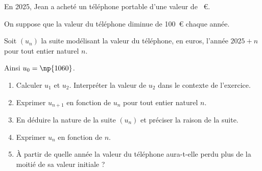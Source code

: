 En 2025, Jean a acheté un téléphone portable d'une valeur de ~\euro.

On suppose que la valeur du téléphone diminue de 100~\euro{} chaque année.

Soit $\left(u_n\right)$ la suite modélisant la valeur du téléphone, en euros, l'année $2025+n$ pour tout entier naturel $n$.

Ainsi $u_0 = \np{1060}$.

\begin{enumerate}
	\item Calculer $u_1$ et $u_2$. Interpréter la valeur de $u_2$ dans le contexte de l'exercice.
	\item Exprimer $u_{n+1}$ en fonction de $u_n$ pour tout entier naturel $n$.
	\item En déduire la nature de la suite $\left(u_n\right)$ et préciser la raison de la suite.
	\item Exprimer $u_n$ en fonction de $n$.
	\item À partir de quelle année la valeur du téléphone aura-t-elle perdu plus de la moitié de sa valeur initiale ?
\end{enumerate}
